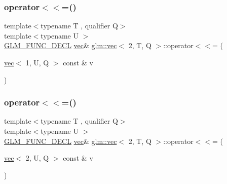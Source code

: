 \mbox{\label{structglm_1_1vec_3_012_00_01_t_00_01_q_01_4_a8ab9f3c08e3bcd5376f5852b15069a43}} 
\subsubsection{\texorpdfstring{operator$<$$<$=()}{operator<<=()}\hspace{0.1cm}{\footnotesize\ttfamily [2/6]}}
{\footnotesize\ttfamily template$<$typename T , qualifier Q$>$ \\
template$<$typename U $>$ \\
\hyperlink{setup_8hpp_ab2d052de21a70539923e9bcbf6e83a51}{G\+L\+M\+\_\+\+F\+U\+N\+C\+\_\+\+D\+E\+CL} \hyperlink{structglm_1_1vec}{vec}\& \hyperlink{structglm_1_1vec}{glm\+::vec}$<$ 2, T, Q $>$\+::operator$<$$<$= (\begin{DoxyParamCaption}\item[{\hyperlink{structglm_1_1vec}{vec}$<$ 1, U, Q $>$ const \&}]{v }\end{DoxyParamCaption})}

\mbox{\label{structglm_1_1vec_3_012_00_01_t_00_01_q_01_4_a6ddb083ba5a5c11f378fb85c8842cc9c}} 
\subsubsection{\texorpdfstring{operator$<$$<$=()}{operator<<=()}\hspace{0.1cm}{\footnotesize\ttfamily [3/6]}}
{\footnotesize\ttfamily template$<$typename T , qualifier Q$>$ \\
template$<$typename U $>$ \\
\hyperlink{setup_8hpp_ab2d052de21a70539923e9bcbf6e83a51}{G\+L\+M\+\_\+\+F\+U\+N\+C\+\_\+\+D\+E\+CL} \hyperlink{structglm_1_1vec}{vec}\& \hyperlink{structglm_1_1vec}{glm\+::vec}$<$ 2, T, Q $>$\+::operator$<$$<$= (\begin{DoxyParamCaption}\item[{\hyperlink{structglm_1_1vec}{vec}$<$ 2, U, Q $>$ const \&}]{v }\end{DoxyParamCaption})}

